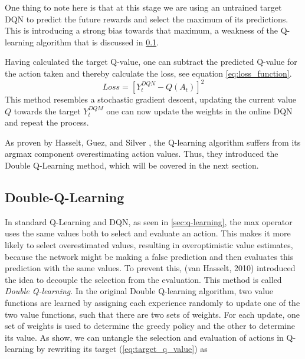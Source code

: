 \documentclass[12pt,a4paper]{article}
\begin{document}
One thing to note here is that at this stage we are using an untrained target DQN to predict the future rewards and select the maximum of its predictions. This is introducing a strong bias towards that maximum, a weakness of the Q-learning algorithm that is discussed in \ref{sec:double_q_learning}. 

Having calculated the target Q-value, one can subtract the predicted Q-value for the action taken and thereby calculate the loss, see equation \ref{eq:loss_function}.
\begin{equation}
    \label{eq:loss_function}
    Loss = [Y_t^{DQN} - Q(A_t)]^2
\end{equation}
This method resembles a stochastic gradient descent, updating the current value $Q$ towards the target $Y_t^{DQM}$ one can now update the weights in the online DQN and repeat the process.

As proven by Hasselt, Guez, and Silver \cite{VanHasselt2015}, the Q-learning algorithm suffers from its argmax component overestimating action values. Thus, they introduced the Double Q-Learning method, which will be covered in the next section.

\subsection{Double-Q-Learning}\label{sec:double_q_learning}
In standard Q-Learning and DQN, as seen in \ref{sec:q-learning}, the max operator uses the same values both to select and evaluate an action. This makes it more likely to select overestimated values, resulting in overoptimistic value estimates, because the network might be making a false prediction and then evaluates this prediction with the same values. To prevent this, (van Hasselt, 2010) introduced the idea to decouple the selection from the evaluation. This method is called {\it Double Q-learning}. In the original Double Q-learning algorithm, two value functions are learned by assigning each experience randomly to update one of the two value functions, such that there are two sets of weights. For each update, one set of weights is used to determine the greedy policy and the other to determine its value. As \cite{VanHasselt2015} show, we can untangle the selection and evaluation of actions in Q-learning by rewriting its target (\ref{eq:target_q_value}) as
\end{document}

